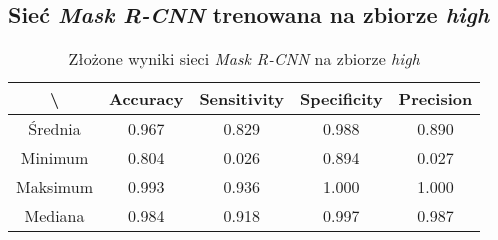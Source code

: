 \subsection{Sieć \textit{Mask R-CNN} trenowana na zbiorze \textit{high}}

\begin{table}[H]
	\centering
	\caption{Złożone wyniki sieci \textit{Mask R-CNN} na zbiorze \textit{high}}
	\vspace{6pt}
	{\footnotesize
		\begin{tabular}{|c|c|c|c|c|}
      \hline \textbackslash & Accuracy & Sensitivity & Specificity & Precision \\
      \hline Średnia & 0.967 & 0.829 & 0.988 & 0.890 \\
      \hline Minimum & 0.804 & 0.026 & 0.894 & 0.027 \\
      \hline Maksimum & 0.993 & 0.936 & 1.000 & 1.000 \\
      \hline Mediana & 0.984 & 0.918 & 0.997 & 0.987 \\
      \hline
		\end{tabular}
	}
  \vspace{0pt}
  \label{Tab:high_original_calculated}
\end{table}

